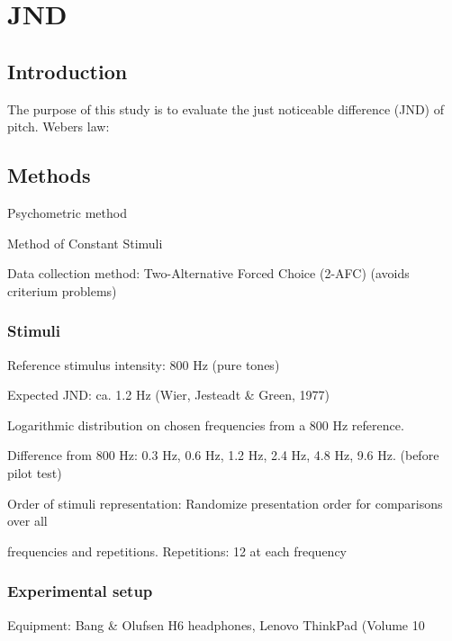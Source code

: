 \chapter*{JND}

\section*{Introduction}
The purpose of this study is to evaluate the just noticeable difference (JND) of pitch.
Webers law:
\begin{description}
\centering
\item[$\frac{\Delta I}{I} = k$]
\end{description}

\section*{Methods}
\begin{description}
\item Psychometric method
\item Method of Constant Stimuli
\item Data collection method: Two-Alternative Forced Choice (2-AFC) (avoids criterium problems)
\end{description}

\subsection*{Stimuli}
\begin{description}
\item Reference stimulus intensity: 800 Hz (pure tones)
\item Expected JND: ca. 1.2 Hz (Wier, Jesteadt \& Green, 1977)
\item Logarithmic distribution on chosen frequencies from a 800 Hz reference.
\item Difference from 800 Hz: 0.3 Hz, 0.6 Hz, 1.2 Hz, 2.4 Hz, 4.8 Hz, 9.6 Hz. (before pilot test)
\item Order of stimuli representation: Randomize presentation order for comparisons over all 
\item frequencies and repetitions.
Repetitions: 12 at each frequency 
\end{description}

\subsection*{Experimental setup}
Equipment: Bang \& Olufsen H6 headphones, Lenovo ThinkPad (Volume 10%

